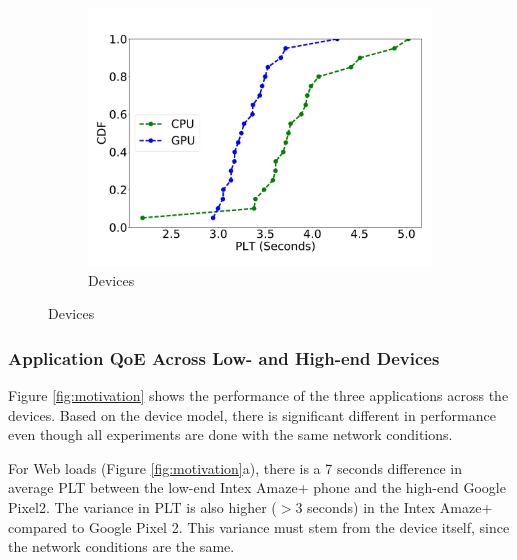 \begin{figure}
\begin{subfigure}[b]{0.33\textwidth}
        \includegraphics[width=1\linewidth]{sections/device-work/plt-gpu}
        \caption{Devices}
    \end{subfigure}
     \vspace*{-1em}
\end{figure}



\subsubsection{Application QoE Across Low- and High-end Devices}

Figure \ref{fig:motivation} shows the performance of the three applications across the devices. Based on the device model, there is significant different in performance even though all experiments
are done with the same network conditions. 

For Web loads (Figure \ref{fig:motivation}a), there is a 7 seconds difference in average PLT between the low-end Intex Amaze+ phone and the high-end Google Pixel2. The variance in PLT is also higher ($>$3 seconds) in the Intex Amaze+ compared to Google Pixel 2. This variance must stem from the device itself, since the network conditions are the same.

